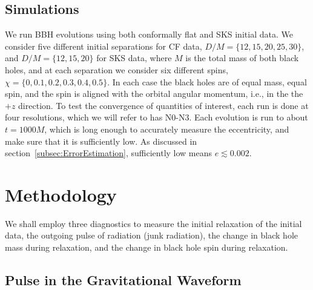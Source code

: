 
\subsection{Simulations}

We run BBH evolutions using both conformally flat and SKS initial
data.  We consider five different initial separations for CF data,
$D/M=\{12,15,20,25,30\}$, and $D/M=\{12,15,20\}$ for SKS data, where $M$ is the total mass of both black
holes, and at each separation we consider  six different spins,
$\chi=\{0,0.1,0.2,0.3,0.4,0.5\}$. In each case the black holes are of
equal mass, equal spin, and the spin is aligned with the orbital
angular momentum, i.e., in the the $+z$ direction. To test the
convergence of quantities of interest, each run is done at four
resolutions, which we will refer to has N0-N3. Each evolution is
run to about $t=1000M$, which is long enough to accurately measure the
eccentricity, and make sure that it is sufficiently low. As discussed in
section~\ref{subsec:ErrorEstimation}, sufficiently low means
$e\lesssim 0.002$.

\section{Methodology}
\label{sec:Methodology}

We shall employ three diagnostics to measure the initial relaxation of
the initial data, the outgoing pulse of radiation (junk radiation),
the change in black hole mass during relaxation, and the change in
black hole spin during relaxation.



\subsection{Pulse in the Gravitational Waveform}

